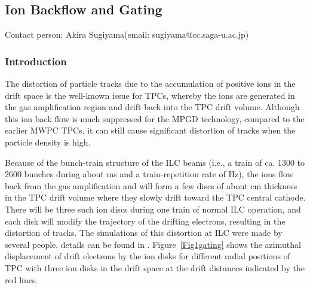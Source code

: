 \subsection{Ion Backflow and Gating}\label{chap:TPC_sec:gating}
Contact person: Akira Sugiyama(email: sugiyama@cc.saga-u.ac.jp)\\



\subsubsection{Introduction}

The distortion of particle tracks due to the accumulation of positive ions in the drift space is the well-known
issue for TPCs, whereby the ions are generated in the gas amplification region and drift back into the TPC drift volume.
Although this ion back flow is much suppressed for the MPGD technology, compared to the earlier MWPC TPCs, it can
still cause significant distortion of tracks when the particle density is high.

Because of the bunch-train structure of the ILC beams (i.e., a  train of ca. 1300 to 2600 bunches during
about \unit[1]{ms}
and a train-repetition rate of \unit[5]{Hz}), the ions flow back from the gas amplification and will form a few discs
of about \unit[1]{cm} thickness in the TPC drift volume where they slowly drift toward the TPC central cathode.
There will be three such ion discs during one train of normal ILC operation, and each disk will modify the trajectory
of the drifting electrons, resulting in the distortion of tracks. The simulations of this distortion at ILC
were made by several people, details can be found in \cite{LC-DET-2012-079,Fujii_IonEffects}.
Figure~\ref{Fig1gating} shows the azimuthal displacement of drift electrons by the ion
disks for different radial positions of TPC with three ion disks in the drift space at the drift distances
indicated by the red lines.




